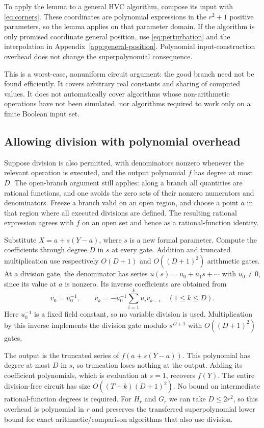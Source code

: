 \documentclass[12pt,a4paper]{article}
\theoremstyle{definition}
\theoremstyle{remark}
\begin{document}
To apply the lemma to a general HVC algorithm, compose its
input with \eqref{eq:corners}. These coordinates are polynomial
expressions in the $r^2+1$ positive parameters, so the lemma applies
on that parameter domain. If the algorithm is only promised coordinate
general position, use \eqref{eq:perturbation} and the interpolation in
Appendix~\ref{app:general-position}. Polynomial input-construction
overhead does not change the superpolynomial consequence.

This is a worst-case, nonuniform circuit argument: the good branch
need not be found efficiently. It covers arbitrary real constants and
sharing of computed values. It does not automatically cover algorithms
whose non-arithmetic operations have not been simulated, nor algorithms
required to work only on a finite Boolean input set.

\subsection{Allowing division with polynomial overhead}

Suppose division is also permitted, with denominators nonzero whenever
the relevant operation is executed, and the output polynomial $f$ has
degree at most $D$. The open-branch argument still applies: along a
branch all quantities are rational functions, and one avoids the zero
sets of their nonzero numerators and denominators. Freeze a branch
valid on an open region, and choose a point $a$ in that region where all
executed divisions are defined. The resulting rational expression agrees
with $f$ on an open set and hence as a rational-function identity.

Substitute $X=a+s(Y-a)$, where $s$ is a new formal parameter. Compute
the coefficients through degree $D$ in $s$ at every gate. Addition and
truncated multiplication use respectively $O(D+1)$ and $O((D+1)^2)$
arithmetic gates. At a division gate, the denominator has series
$u(s)=u_0+u_1s+\cdots$ with $u_0\ne0$, since its value at $a$ is
nonzero. Its inverse coefficients are obtained from
\[
 v_0=u_0^{-1},\qquad
 v_k=-u_0^{-1}\sum_{i=1}^k u_i v_{k-i}\quad(1\le k\le D).
\]
Here $u_0^{-1}$ is a fixed field constant, so no variable division is
used. Multiplication by this inverse implements the division gate
modulo $s^{D+1}$ with $O((D+1)^2)$ gates.

The output is the truncated series of $f(a+s(Y-a))$. This polynomial
has degree at most $D$ in $s$, so truncation loses nothing at the output.
Adding its coefficient polynomials, which is evaluation at $s=1$,
recovers $f(Y)$. The entire division-free circuit has size
$O((T+k)(D+1)^2)$. No bound on intermediate rational-function degrees
is required. For $H_r$ and $G_r$ we can take $D\le2r^2$, so this
overhead is polynomial in $r$ and preserves the transferred
superpolynomial lower bound for exact arithmetic/comparison algorithms
that also use division.
\end{document}

